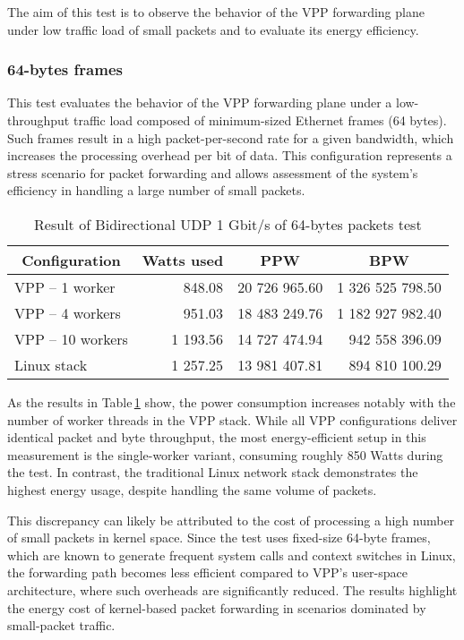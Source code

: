 The aim of this test is to observe the behavior of the VPP forwarding plane under low traffic load of small packets and to evaluate its energy efficiency.

\subsubsection{64-bytes frames}
This test evaluates the behavior of the VPP forwarding plane under a low-throughput traffic load composed of minimum-sized Ethernet frames (64 bytes). 
Such frames result in a high packet-per-second rate for a given bandwidth, which increases the processing overhead per bit of data. 
This configuration represents a stress scenario for packet forwarding and allows assessment of the system’s efficiency in handling a large number of small packets.

\begin{table}[h!]
\centering
\begin{tabular}{|l|r|r|r|}
\hline
\multicolumn{1}{|c|}{\textbf{Configuration}} &
\multicolumn{1}{c|}{\textbf{Watts used}} &
\multicolumn{1}{c|}{\textbf{PPW}} &
\multicolumn{1}{c|}{\textbf{BPW}} \\
\hline
VPP -- 1 worker & 848.08 & 20 726 965.60 & 1 326 525 798.50 \\
VPP -- 4 workers & 951.03 & 18 483 249.76 & 1 182 927 982.40 \\
VPP -- 10 workers & 1 193.56 & 14 727 474.94 & 942 558 396.09 \\
Linux stack & 1 257.25 & 13 981 407.81 & 894 810 100.29 \\
\hline
\end{tabular}
\caption{Result of Bidirectional UDP 1 Gbit/s of 64-bytes packets test}
\label{tab:udp:one}
\end{table}

As the results in Table \ref{tab:udp:one} show, the power consumption increases notably with the number of worker threads in the VPP stack. 
While all VPP configurations deliver identical packet and byte throughput, the most energy-efficient setup in this measurement is the single-worker variant, consuming roughly 850 Watts during the test. 
In contrast, the traditional Linux network stack demonstrates the highest energy usage, despite handling the same volume of packets.

This discrepancy can likely be attributed to the cost of processing a high number of small packets in kernel space. 
Since the test uses fixed-size 64-byte frames, which are known to generate frequent system calls and context switches in Linux, 
the forwarding path becomes less efficient compared to VPP’s user-space architecture, where such overheads are significantly reduced. 
The results highlight the energy cost of kernel-based packet forwarding in scenarios dominated by small-packet traffic.

